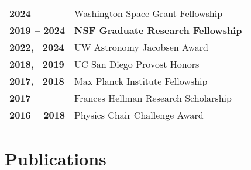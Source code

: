 \documentclass[a4,11pt]{article}
\newcommand{\hskills}[1]{
\textbf{\bfseries #1} }
\let\orighref\href
\renewcommand{\href}[2]{\orighref{#1}{#2\,\scriptsize\faExternalLink}}
\begin{document}
\begin{tabular}[t]{ p{9em} p{50em}}
\hskills{2024} & Washington Space Grant Fellowship \\
\hskills{2019 -- 2024} & \textbf{NSF Graduate Research Fellowship} \\ %
\hskills{2022, \, 2024} & UW Astronomy Jacobsen Award  \\
\hskills{2018, \, 2019} & UC San Diego Provost Honors  \\ %
\hskills{2017, \, 2018} & Max Planck Institute Fellowship \\ %
\hskills{2017} & Frances Hellman Research Scholarship \\  %
\hskills{2016 -- 2018} & Physics Chair Challenge Award \\ %
\end{tabular} 


\section{Publications} 


\end{document}
